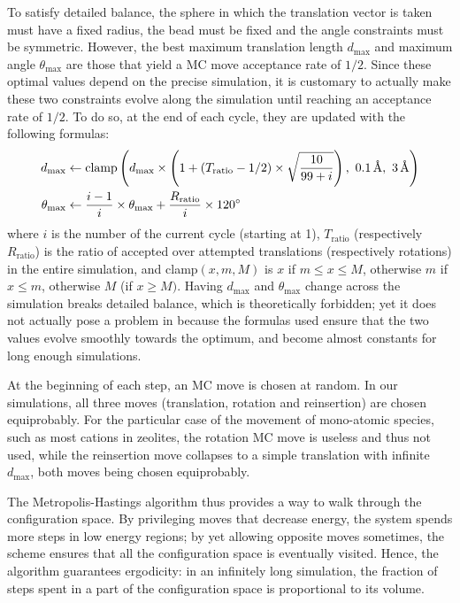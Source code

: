 \documentclass[main.tex]{subfiles}
\begin{document}
To satisfy detailed balance, the sphere in which the translation vector is taken must have a fixed radius, the bead must be fixed and the angle constraints must be symmetric. However, the best maximum translation length $d_{\max}$ and maximum angle $\theta_{\max}$ are those that yield a MC move acceptance rate of $1/2$. Since these optimal values depend on the precise simulation, it is customary to actually make these two constraints evolve along the simulation until reaching an acceptance rate of $1/2$. To do so, at the end of each cycle, they are updated with the following formulas:
\[\begin{split}
	d_{\max} &\gets \text{clamp}\paren{
		d_{\max}\times\paren{1+\paren{T_\text{ratio} - 1/2}\times\sqrt{\frac{10}{99+i}}},\ \qty{0.1}{\angstrom},\ \qty{3}{\angstrom}
	}\\
	\theta_{\max} &\gets \frac{i-1}i\times\theta_{\max} + \frac{R_\text{ratio}}{i}\times\qty{120}{\degree}
\end{split}\]
where $i$ is the number of the current cycle (starting at 1), $T_\text{ratio}$ (respectively $R_\text{ratio}$) is the ratio of accepted over attempted translations (respectively rotations) in the entire simulation, and clamp$(x, m, M)$ is $x$ if $m\le x \le M$, otherwise $m$ if $x\le m$, otherwise $M$ (if $x\ge M)$. Having $d_{\max}$ and $\theta_{\max}$ change across the simulation breaks detailed balance, which is theoretically forbidden; yet it does not actually pose a problem in because the formulas used ensure that the two values evolve smoothly towards the optimum, and become almost constants for long enough simulations.

At the beginning of each step, an MC move is chosen at random. In our simulations, all three moves (translation, rotation and reinsertion) are chosen equiprobably. For the particular case of the movement of mono-atomic species, such as most cations in zeolites, the rotation MC move is useless and thus not used, while the reinsertion move collapses to a simple translation with infinite $d_{\max}$, both moves being chosen equiprobably.

The Metropolis-Hastings algorithm thus provides a way to walk through the configuration space. By privileging moves that decrease energy, the system spends more steps in low energy regions; by yet allowing opposite moves sometimes, the scheme ensures that all the configuration space is eventually visited. Hence, the algorithm guarantees ergodicity: in an infinitely long simulation, the fraction of steps spent in a part of the configuration space is proportional to its volume. %
\end{document}
